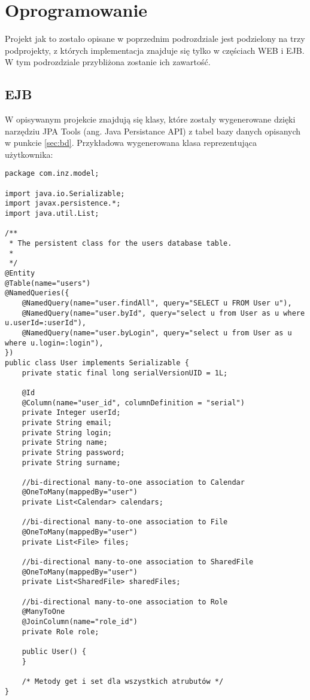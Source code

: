 \section{Oprogramowanie}
Projekt jak to zostało opisane w poprzednim podrozdziale jest podzielony na trzy podprojekty, z których implementacja znajduje się tylko w częściach WEB i EJB. W tym podrozdziale przybliżona zostanie ich zawartość.
\subsection{EJB}
\label{subsec:ejb}
W opisywanym projekcie znajdują się klasy, które zostały wygenerowane dzięki narzędziu JPA Tools (ang. Java Persistance API) z tabel bazy danych opisanych w punkcie \ref{sec:bd}. Przykładowa wygenerowana klasa reprezentująca użytkownika:
\begin{lstlisting}
package com.inz.model;

import java.io.Serializable;
import javax.persistence.*;
import java.util.List;

/**
 * The persistent class for the users database table.
 * 
 */
@Entity
@Table(name="users")
@NamedQueries({
	@NamedQuery(name="user.findAll", query="SELECT u FROM User u"),
	@NamedQuery(name="user.byId", query="select u from User as u where u.userId=:userId"),
	@NamedQuery(name="user.byLogin", query="select u from User as u where u.login=:login"),
})
public class User implements Serializable {
	private static final long serialVersionUID = 1L;

	@Id
	@Column(name="user_id", columnDefinition = "serial")
	private Integer userId;
	private String email;
	private String login;
	private String name;
	private String password;
	private String surname;

	//bi-directional many-to-one association to Calendar
	@OneToMany(mappedBy="user")
	private List<Calendar> calendars;

	//bi-directional many-to-one association to File
	@OneToMany(mappedBy="user")
	private List<File> files;

	//bi-directional many-to-one association to SharedFile
	@OneToMany(mappedBy="user")
	private List<SharedFile> sharedFiles;

	//bi-directional many-to-one association to Role
	@ManyToOne
	@JoinColumn(name="role_id")
	private Role role;

	public User() {
	}

	/* Metody get i set dla wszystkich atrubutów */
}
\end{lstlisting}
